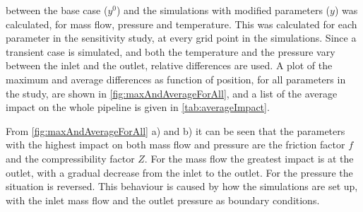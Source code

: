 between the base case ($y^0$) and the simulations with modified parameters ($y$) was calculated, for mass flow, pressure and temperature. %
This was calculated for each parameter in the sensitivity study, at every grid point in the simulations. Since a transient case is simulated, and both the temperature and the pressure vary between the inlet and the outlet, relative differences are used. %
%
%
A plot of the maximum and average differences as function of position, for all parameters in the study, are shown in \cref{fig:maxAndAverageForAll}, and a list of the average impact on the whole pipeline is given in \cref{tab:averageImpact}. %

From \cref{fig:maxAndAverageForAll} a) and b) it can be seen that the parameters with the highest impact on both mass flow and pressure are the friction factor $f$ and the compressibility factor $Z$. For the mass flow the greatest impact is at the outlet, with a gradual decrease from the inlet to the outlet. For the pressure the situation is reversed. This behaviour is caused by how the simulations are set up, with the inlet mass flow and the outlet pressure as boundary conditions.


